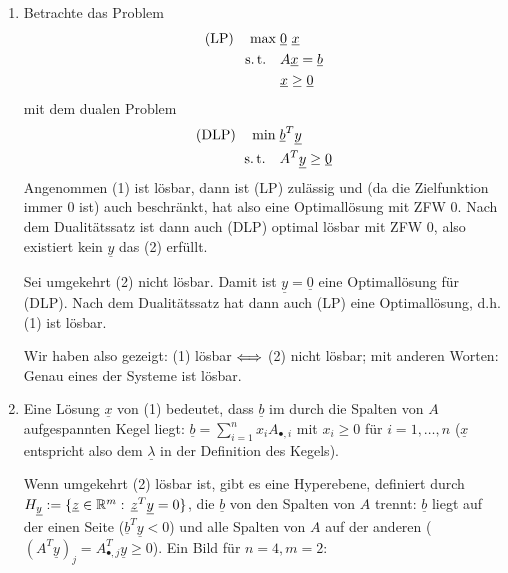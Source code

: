 \documentclass[11pt,german,a4paper,parskip=half-]{scrartcl}
\newcommand\st{\text{s.\,t.}\xspace}
\renewcommand{\u}[1]{\ensuremath{\underline{#1}}} %
\begin{document}
\begin{solution}
\begin{enumerate}
 \item Betrachte das Problem
\begin{align*}
 \text{(LP)}\quad\max\;&\u 0\ \u x\\
\st\quad&A\u x  = \u b\\
&\u x\geq \u 0
\end{align*}
mit dem dualen Problem
\begin{align*}
 \text{(DLP)}\quad\min\;&\u b^T\u y\\
\st\quad&A^T\u y \geq \u 0
\end{align*}
Angenommen (1) ist lösbar, dann ist (LP) zulässig und (da die Zielfunktion immer $0$ ist) auch beschränkt, hat also eine Optimallösung mit ZFW $0$. Nach dem Dualitätssatz ist dann auch (DLP) optimal lösbar
mit ZFW $0$, also existiert kein $\u y$ das (2) erfüllt.

Sei umgekehrt (2) nicht lösbar. Damit ist $\u y = \u 0$ eine Optimallösung für (DLP). Nach dem Dualitätssatz hat dann auch (LP) eine Optimallösung, d.h. (1) ist lösbar.

Wir haben also gezeigt: (1) lösbar $\Llra$ (2) nicht lösbar; mit anderen Worten: Genau eines der Systeme ist lösbar.
\item Eine Lösung $\u x$ von (1) bedeutet, dass $\u b$ im durch die Spalten von $A$ aufgespannten Kegel liegt: $\u b = \sum_{i=1}^n x_i A_{•,i}$ mit $x_i \geq 0$ für $i=1,\dotsc,n$ ($\u x$ entspricht also
dem $\u \lambda$ in der Definition des Kegels).

Wenn umgekehrt (2) lösbar ist, gibt es eine Hyperebene, definiert durch $H_{\u y} := \{ \u z \in \R^m:\,  \u z^T \u y = 0\}$, die $\u b$ von den Spalten von $A$ trennt: $\u b$ liegt auf der einen Seite ($\u b^T\u y < 0$) und alle Spalten von $A$ auf der anderen ($(A^T \u y)_j = A_{•,j}^T \u y \geq 0$). Ein Bild für $n=4,m=2$:
\begin{center}
\qquad
\begin{tikzpicture}[every node/.style={fill=red,draw,circle,inner sep=0mm,minimum size=1.5mm},scale=.8]


\end{tikzpicture}
\end{center}
\end{enumerate}
\end{solution}
\end{document}
